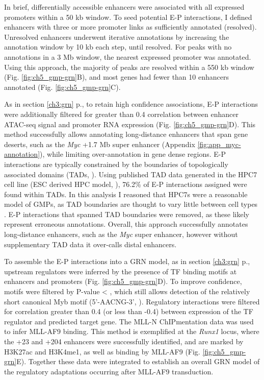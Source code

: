 In brief, differentially accessible enhancers were associated with all expressed promoters within a 50 kb window. To seed potential E-P interactions, I defined enhancers with three or more promoter links as sufficiently annotated (resolved). Unresolved enhancers underwent iterative annotations by increasing the annotation window by 10 kb each step, until resolved. For peaks with no annotations in a 3 Mb window, the nearest expressed promoter was annotated. Using this approach, the majority of peaks are resolved within a 550 kb window (Fig. \ref{fig:ch5_gmp-grn}B), and most genes had fewer than 10 enhancers annotated (Fig. \ref{fig:ch5_gmp-grn}C).

As in section \ref{ch3:grn} p.\pageref{ch3:grn}, to retain high confidence associations, E-P interactions were additionally filtered for greater than 0.4 correlation between enhancer ATAC-seq signal and promoter RNA expression (Fig. \ref{fig:ch5_gmp-grn}D). This method successfully allows annotating long-distance enhancers that span gene deserts, such as the \textit{Myc} +1.7 Mb super enhancer \citep{shi_role_2013} (Appendix \ref{fig:app_myc-annotation}), while limiting over-annotation in gene dense regions. E-P interactions are typically constrained by the boundaries of topologically associated domains (TADs, \cite{beagan_existence_2020}). Using published TAD data \citep{wilson_integrated_2016, xiang_integrative_2020} generated in the HPC7 cell line (ESC derived HPC model, \cite{pinto_do_o_expression_1998}), 76.2\% of E-P interactions assigned were found within TADs. In this analysis I reasoned that HPC7s were a reasonable model of GMPs, as TAD boundaries are thought to vary little between cell types \citep{beagan_existence_2020}. E-P interactions that spanned TAD boundaries were removed, as these likely represent erroneous annotations. Overall, this approach successfully annotates long-distance enhancers, such as the \textit{Myc} super enhancer, however without supplementary TAD data it over-calls distal enhancers.

To assemble the E-P interactions into a GRN model, as in section \ref{ch3:grn} p.\pageref{ch3:grn}, upstream regulators were inferred by the presence of TF binding motifs at enhancers and promoters (Fig. \ref{fig:ch5_gmp-grn}D). To improve confidence, motifs were filtered by P-value < , which still allows detection of the relatively short canonical Myb motif (5'-AACNG-3', \cite{ogata_solution_1994}). Regulatory interactions were filtered for correlation greater than 0.4 (or less than -0.4) between expression of the TF regulator and predicted target gene. The MLL-N ChIPmentation data was used to infer MLL-AF9 binding. This method is exemplified at the \textit{Runx1} locus, where the +23 and +204 enhancers were successfully identified, and are marked by H3K27ac and H3K4me1, as well as binding by MLL-AF9 (Fig. \ref{fig:ch5_gmp-grn}E). Together these data were integrated to establish an overall GRN model of the regulatory adaptations occurring after MLL-AF9 transduction. 

